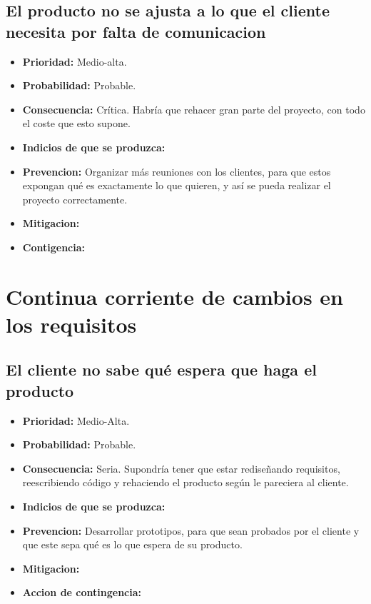 \documentclass[spanish,a4paper,12pt]{report}	%
\begin{document}
\subsection*{El producto no se ajusta a lo que el cliente necesita por falta de comunicacion}			
	\begin{itemize}
		\item \textbf {Prioridad: }Medio-alta.
		\item \textbf {Probabilidad: }Probable.
		\item \textbf {Consecuencia: }Crítica. Habría que rehacer gran parte del proyecto, con todo el coste que esto supone.
		\item \textbf {Indicios de que se produzca: }
		\item \textbf {Prevencion: }Organizar más reuniones con los clientes, para que estos expongan qué es exactamente lo que quieren, y así se pueda realizar el proyecto correctamente. 
		\item \textbf {Mitigacion: }
		\item \textbf {Contigencia: }
	\end{itemize}

%
\section{Continua corriente de cambios en los requisitos}
\subsection*{El cliente no sabe qué espera que haga el producto}		

	\begin{itemize}
		\item \textbf {Prioridad: }Medio-Alta.
		\item \textbf {Probabilidad: }Probable.
		\item \textbf {Consecuencia: }Seria. Supondría tener que estar rediseñando requisitos, reescribiendo código y rehaciendo el producto según le pareciera al cliente.
		\item \textbf {Indicios de que se produzca: }
		\item \textbf {Prevencion: }Desarrollar prototipos, para que sean probados por el cliente y que este sepa qué es lo que espera de su producto.
		\item \textbf {Mitigacion: }
		\item \textbf {Accion de contingencia: }
	\end{itemize}
\end{document}
